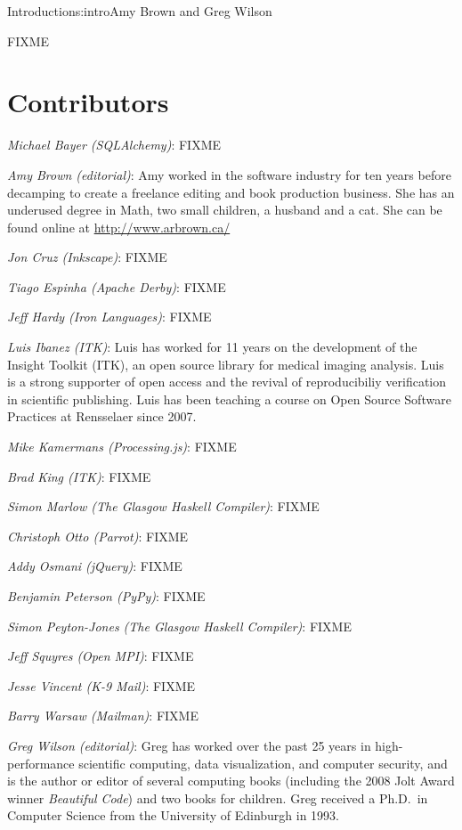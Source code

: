 \begin{aosachapter}{Introduction}{s:intro}{Amy Brown and Greg Wilson}

FIXME

\section*{Contributors}

\emph{Michael Bayer (SQLAlchemy)}: FIXME

\emph{Amy Brown (editorial)}: Amy worked in the software industry for
ten years before decamping to create a freelance editing and book production
business. She has an underused degree in Math, two small children, a
husband and a cat. She can be found online at \url{http://www.arbrown.ca/}

\emph{Jon Cruz (Inkscape)}: FIXME

\emph{Tiago Espinha (Apache Derby)}: FIXME

\emph{Jeff Hardy (Iron Languages)}: FIXME

\emph{Luis Ibanez (ITK)}: Luis has worked for 11 years on the development of
the Insight Toolkit (ITK), an open source library for medical imaging analysis.
Luis is a strong supporter of open access and the revival of reproducibiliy
verification in scientific publishing. Luis has been teaching a course on Open
Source Software Practices at Rensselaer since 2007.

\emph{Mike Kamermans (Processing.js)}: FIXME

\emph{Brad King (ITK)}: FIXME

\emph{Simon Marlow (The Glasgow Haskell Compiler)}: FIXME

\emph{Christoph Otto (Parrot)}: FIXME

\emph{Addy Osmani (jQuery)}: FIXME

\emph{Benjamin Peterson (PyPy)}: FIXME

\emph{Simon Peyton-Jones (The Glasgow Haskell Compiler)}: FIXME

\emph{Jeff Squyres (Open MPI)}: FIXME

\emph{Jesse Vincent (K-9 Mail)}: FIXME

\emph{Barry Warsaw (Mailman)}: FIXME

\emph{Greg Wilson (editorial)}: Greg has worked over the past 25 years
in high-performance scientific computing, data visualization, and
computer security, and is the author or editor of several computing
books (including the 2008 Jolt Award winner \emph{Beautiful Code}) and
two books for children.  Greg received a Ph.D.\ in Computer Science
from the University of Edinburgh in 1993.


\end{aosachapter}
